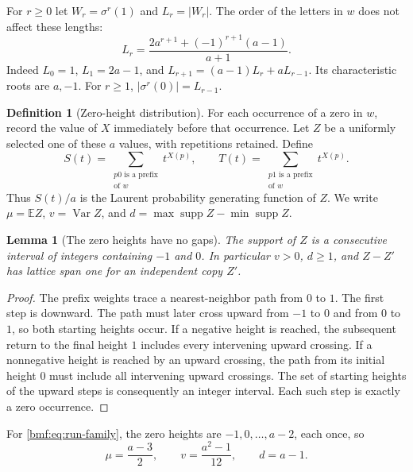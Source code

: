 \documentclass[11pt]{article}
\numberwithin{equation}{section}
\newtheorem{lemma}[theorem]{Lemma}
\theoremstyle{definition}
\newtheorem{definition}[theorem]{Definition}
\theoremstyle{remark}
\newcommand{\E}{\mathbb E}
\newcommand{\Var}{\operatorname{Var}}
\newcommand{\supp}{\operatorname{supp}}
\begin{document}
For $r\geq0$ let $W_r=\sigma^r(1)$ and $L_r=|W_r|$.
The order of the letters in $w$ does not affect these lengths:
\begin{equation}\label{bmf:eq:length}
 L_r=\frac{2a^{r+1}+(-1)^{r+1}(a-1)}{a+1}.
\end{equation}
Indeed $L_0=1$, $L_1=2a-1$, and
$L_{r+1}=(a-1)L_r+aL_{r-1}$. Its characteristic roots are $a,-1$.
For $r\geq1$, $|\sigma^r(0)|=L_{r-1}$.

\begin{definition}[Zero-height distribution]\label{bmf:def:zero-height}
For each occurrence of a zero in $w$, record the value of $X$
immediately before that occurrence. Let $Z$ be a uniformly selected
one of these $a$ values, with repetitions retained. Define
\begin{equation}\label{bmf:eq:ST}
 S(t)=\sum_{\substack{p0\text{ is a prefix}\\\text{of }w}}t^{X(p)},
 \qquad
 T(t)=\sum_{\substack{p1\text{ is a prefix}\\\text{of }w}}t^{X(p)}.
\end{equation}
Thus $S(t)/a$ is the Laurent probability generating function of $Z$.
We write $\mu=\E Z$, $v=\Var Z$, and
$d=\max\supp Z-\min\supp Z$.
\end{definition}

\begin{lemma}[The zero heights have no gaps]\label{bmf:lem:gaps}
The support of $Z$ is a consecutive interval of integers containing
$-1$ and $0$. In particular $v>0$, $d\geq1$, and $Z-Z'$ has lattice
span one for an independent copy $Z'$.
\end{lemma}
\begin{proof}
The prefix weights trace a nearest-neighbor path from $0$ to $1$.
The first step is downward. The path must later cross upward from
$-1$ to $0$ and from $0$ to $1$, so both starting heights occur.
If a negative height is reached, the subsequent return to the final
height $1$ includes every intervening upward crossing. If a
nonnegative height is reached by an upward crossing, the path from
its initial height $0$ must include all intervening upward crossings.
The set of starting heights of the upward steps is consequently
an integer interval. Each such step is exactly a zero occurrence.
\end{proof}

For \eqref{bmf:eq:run-family}, the zero heights are
$-1,0,\ldots,a-2$, each once, so
\begin{equation}\label{bmf:eq:run-muv}
 \mu=\frac{a-3}{2},\qquad
 v=\frac{a^2-1}{12},\qquad d=a-1.
\end{equation}
\end{document}
